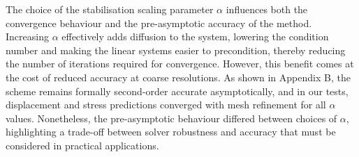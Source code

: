 \documentclass[sn-mathphys,Numbered]{sn-jnl}%
\begin{document}


The choice of the stabilisation scaling parameter $\alpha$ influences both the convergence behaviour and the pre-asymptotic accuracy of the method. Increasing $\alpha$ effectively adds diffusion to the system, lowering the condition number and making the linear systems easier to precondition, thereby reducing the number of iterations required for convergence. However, this benefit comes at the cost of reduced accuracy at coarse resolutions. As shown in Appendix B, the scheme remains formally second-order accurate asymptotically, and in our tests, displacement and stress predictions converged with mesh refinement for all $\alpha$ values.
Nonetheless, the pre-asymptotic behaviour differed between choices of $\alpha$, highlighting a trade-off between solver robustness and accuracy that must be considered in practical applications.
\end{document}
